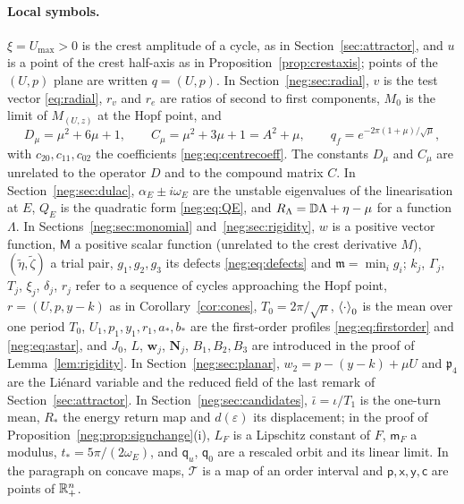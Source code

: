 \paragraph{Local symbols.}
$\xi=U_{\max}>0$ is the crest amplitude of a cycle, as in Section~\ref{sec:attractor}, and $u$ is a point of the crest half-axis as in Proposition~\ref{prop:crestaxis}; points of the $(U,p)$ plane are written $q=(U,p)$. In Section~\ref{neg:sec:radial}, $v$ is the test vector \eqref{eq:radial}, $r_v$ and $r_e$ are ratios of second to first components, $M_0$ is the limit of $M_{(U,z)}$ at the Hopf point, and
\begin{equation}\label{neg:eq:constants}
D_\mu=\mu^2+6\mu+1,\qquad C_\mu=\mu^2+3\mu+1=A^2+\mu,\qquad q_f=e^{-2\pi(1+\mu)/\sqrt\mu},
\end{equation}
with $c_{20},c_{11},c_{02}$ the coefficients \eqref{neg:eq:centrecoeff}. The constants $D_\mu$ and $C_\mu$ are unrelated to the operator $D$ and to the compound matrix $C$. In Section~\ref{neg:sec:dulac}, $\alpha_E\pm i\omega_E$ are the unstable eigenvalues of the linearisation at $E$, $Q_E$ is the quadratic form \eqref{neg:eq:QE}, and $R_\Lambda=\mathbb D\Lambda+\eta-\mu$ for a function $\Lambda$. In Sections~\ref{neg:sec:monomial} and~\ref{neg:sec:rigidity}, $w$ is a positive vector function, $\mathsf M$ a positive scalar function (unrelated to the crest derivative $M$), $(\tilde\eta,\tilde\zeta)$ a trial pair, $g_1,g_2,g_3$ its defects \eqref{neg:eq:defects} and $\mathfrak m=\min_ig_i$; $k_j$, $\Gamma_j$, $T_j$, $\xi_j$, $\delta_j$, $r_j$ refer to a sequence of cycles approaching the Hopf point, $r=(U,p,y-k)$ as in Corollary~\ref{cor:cones}, $T_0=2\pi/\sqrt\mu$, $\left\langle \cdot\right\rangle_0$ is the mean over one period $T_0$, $U_1,p_1,y_1,r_1,a_*,b_*$ are the first-order profiles \eqref{neg:eq:firstorder} and \eqref{neg:eq:astar}, and $J_0$, $L$, $\mathbf w_j$, $\mathbf N_j$, $B_1,B_2,B_3$ are introduced in the proof of Lemma~\ref{lem:rigidity}. In Section~\ref{neg:sec:planar}, $w_2=p-(y-k)+\mu U$ and $\mathfrak p_4$ are the Li\'enard variable and the reduced field of the last remark of Section~\ref{sec:attractor}. In Section~\ref{neg:sec:candidates}, $\bar\iota=\iota/T_1$ is the one-turn mean, $R_\ast$ the energy return map and $d(\varepsilon)$ its displacement; in the proof of Proposition~\ref{neg:prop:signchange}(i), $L_F$ is a Lipschitz constant of $F$, $\mathsf m_F$ a modulus, $t_*=5\pi/(2\omega_E)$, and $\mathsf q_u$, $\mathsf q_0$ are a rescaled orbit and its linear limit. In the paragraph on concave maps, $\mathcal T$ is a map of an order interval and $\mathsf p,\mathsf x,\mathsf y,\mathsf c$ are points of $\mathbb R^n_+$.

